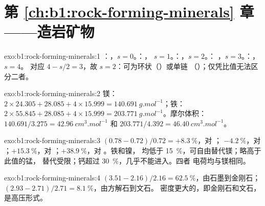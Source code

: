 \section*{第 \ref{ch:b1:rock-forming-minerals} 章——造岩矿物}

\begin{solution}{exo:b1:rock-forming-minerals:1}
：，$s = 0$。：，
$s = 1$。：，$s = 2$。：
，$s = 3$。：，$s = 4$。
对应 $4 - s/2 = 3$，故 $s = 2$：可为环状（）或单链
（）；仅凭比值无法区分二者。
\end{solution}

\begin{solution}{exo:b1:rock-forming-minerals:2}
镁：$2\times24.305 + 28.085 + 4\times15.999 =
\qty{140.691}{g.mol^{-1}}$；铁：$2\times55.845 + 28.085 +
4\times15.999 = \qty{203.771}{g.mol^{-1}}$。摩尔体积：
$140.691/3.275 = \qty{42.96}{cm^3.mol^{-1}}$ 和 $203.771/4.392 =
\qty{46.40}{cm^3.mol^{-1}}$。
\end{solution}

\begin{solution}{exo:b1:rock-forming-minerals:3}
$(0.78 - 0.72)/0.72 = +\qty{8.3}{\percent}$，对 ；
$-\qty{4.2}{\percent}$，对 ；$+\qty{15.3}{\percent}$，对
；$+\qty{38.9}{\percent}$，对 。铁和镍，
均低于 \qty{15}{\percent}，可自由替代镁；略高于此值的锰，
替代受限；钙超过 \qty{30}{\percent}，几乎不能进入。四者
电荷均与镁相同。
\end{solution}

\begin{solution}{exo:b1:rock-forming-minerals:4}
$(3.51 - 2.16)/2.16 = \qty{62.5}{\percent}$，由石墨到金刚石；
$(2.93 - 2.71)/2.71 = \qty{8.1}{\percent}$，由方解石到文石。
密度更大的，即金刚石和文石，是高压形式。
\end{solution}

